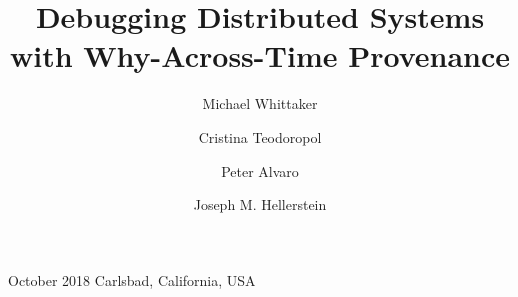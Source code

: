 \documentclass[sigconf]{acmart}
\begin{document}
\title{Debugging Distributed Systems with Why-Across-Time Provenance}
%
              {October 2018}%
              {Carlsbad, California, USA}

\author{Michael Whittaker}

\author{Cristina Teodoropol}

\author{Peter Alvaro}

\author{Joseph M. Hellerstein}
\renewcommand{\shortauthors}{M. Whittaker et al.}

{}
\maketitle
{}
{}
{}
{}
{}
{}
{}
{}



\end{document}
